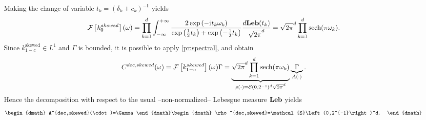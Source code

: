 Making the change of variable $t_k=(\delta_k+c_k)^{-1}$ yields
\begin{dmath*}
\FT{k_0^{skewed}}(\omega)= \prod_{k=1}^d\int_{-\infty}^{+\infty} \frac{2\exp\left(-\iu t_k\omega_k\right)}{\exp\left(\frac{1}{2}t_k\right)+\exp\left(-\frac{1}{2}t_k\right)} \frac{d\Leb(t_k)}{\sqrt{2\pi}^d}
=\sqrt{2\pi}^d\prod_{k=1}^d\sech(\pi\omega_k).
\end{dmath*}
Since $k^{\text{skewed}}_{1-c}\in L^1$ and $\Gamma$ is bounded, it is possible to apply \cref{pr:spectral}, and obtain
\begin{dmath*}
C^{dec,skewed}(\omega)
=\FT{k_{1-c}^{skewed}}(\omega)\Gamma
=\underbrace{\sqrt{2\pi}^d\prod_{k=1}^d\sech(\pi\omega_k)}_{\rho(\cdot)=\mathcal{S}(0,2^{-1})^d\sqrt{2\pi}^d}\underbrace{\Gamma}_{A(\cdot)}.
\end{dmath*}
Hence the decomposition with respect to the usual --non-normalized-- Lebesgue measure $\mathbf{Leb}$ yields
\begin{dgroup}
\begin{dmath}
A^{dec,skewed}(\cdot)=\Gamma
\end{dmath}
\begin{dmath}
\rho^{dec,skewed}=\mathcal{S}\left(0,2^{-1}\right)^d.
\end{dmath}
\end{dgroup}
